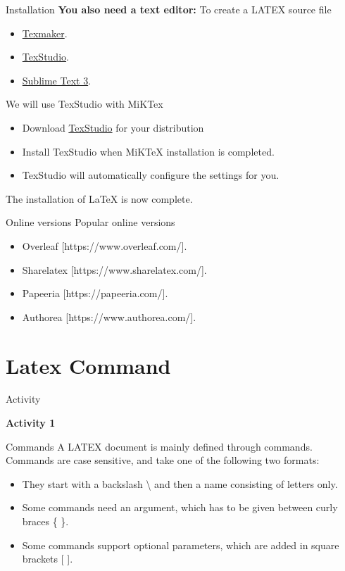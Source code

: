 \documentclass{bredelebeamer}
\begin{document}
\begin{frame}{Installation}
\textbf{You also need a text editor:} To create a LATEX source file
\begin{itemize}
\item \href{http://www.xm1math.net/texmaker/}{Texmaker}.
\item \href{http://www.texstudio.org/}{TexStudio}.
\item \href{https://www.sublimetext.com/3}{Sublime Text 3}.
\end{itemize}
We will use TexStudio with MiKTex
\begin{itemize}
	\item Download \href{http://www.texstudio.org/}{TexStudio} for your distribution
	\item Install TexStudio when MiKTeX installation is completed.
	\item TexStudio will automatically configure the settings for you.
\end{itemize}
 The installation of LaTeX is now complete.

\end{frame}

\begin{frame}{Online versions}
Popular online versions
\begin{itemize}
	\item Overleaf [https://www.overleaf.com/].
	\item Sharelatex [https://www.sharelatex.com/].
	\item Papeeria [https://papeeria.com/].
	\item Authorea [https://www.authorea.com/].
\end{itemize}
\end{frame}  



\section{Latex Command}

\begin{frame}[fragile]{Activity}
\begin{center}
	{\Large \textbf{Activity 1}}
\end{center}

\end{frame}

\begin{frame}{Commands}
A LATEX document is mainly defined through commands. \\[1.0cm] 
Commands are case sensitive, and take one of the following two formats:
\begin{itemize}
\item They start with a backslash \alert{\textbackslash}  and then a name consisting of letters only.
\item Some commands need an argument, which has to be given between curly braces \{  \}.
\item Some commands support optional parameters, which
are added in square brackets [ ].
\end{itemize}
\end{frame}
\end{document}
